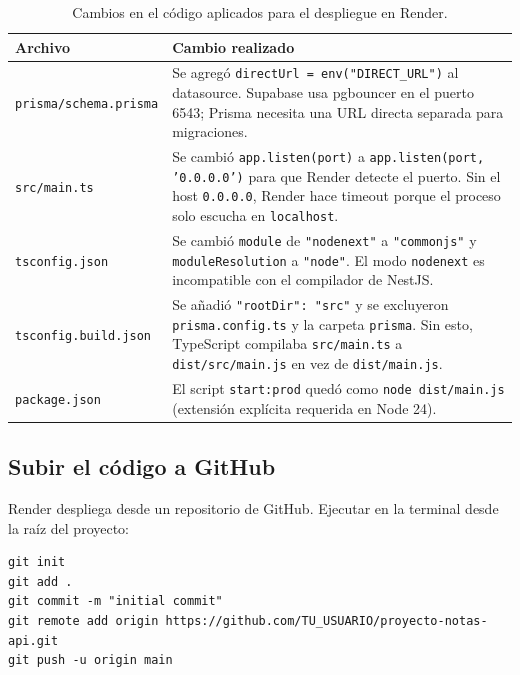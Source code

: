 \documentclass[12pt, a4paper]{article}
\newcommand{\cmd}[1]{\texttt{#1}}
\begin{document}
\begin{table}[H]
    \centering
    \begin{tabular}{p{4.5cm} p{9cm}}
        \toprule
        \textbf{Archivo} & \textbf{Cambio realizado} \\
        \midrule
        \cmd{prisma/schema.prisma}  & Se agregó \cmd{directUrl = env("DIRECT\_URL")} al datasource. Supabase usa pgbouncer en el puerto 6543; Prisma necesita una URL directa separada para migraciones. \\[0.3cm]
        \cmd{src/main.ts}           & Se cambió \cmd{app.listen(port)} a \cmd{app.listen(port, '0.0.0.0')} para que Render detecte el puerto. Sin el host \cmd{0.0.0.0}, Render hace timeout porque el proceso solo escucha en \cmd{localhost}. \\[0.3cm]
        \cmd{tsconfig.json}         & Se cambió \cmd{module} de \cmd{"nodenext"} a \cmd{"commonjs"} y \cmd{moduleResolution} a \cmd{"node"}. El modo \cmd{nodenext} es incompatible con el compilador de NestJS. \\[0.3cm]
        \cmd{tsconfig.build.json}   & Se añadió \cmd{"rootDir": "src"} y se excluyeron \cmd{prisma.config.ts} y la carpeta \cmd{prisma}. Sin esto, TypeScript compilaba \cmd{src/main.ts} a \cmd{dist/src/main.js} en vez de \cmd{dist/main.js}. \\[0.3cm]
        \cmd{package.json}          & El script \cmd{start:prod} quedó como \cmd{node dist/main.js} (extensión explícita requerida en Node 24). \\
        \bottomrule
    \end{tabular}
    \caption{Cambios en el código aplicados para el despliegue en Render.}
\end{table}

\subsection{Subir el código a GitHub}

Render despliega desde un repositorio de GitHub. Ejecutar en la terminal desde la raíz del proyecto:

\begin{lstlisting}[style=bash]
git init
git add .
git commit -m "initial commit"
git remote add origin https://github.com/TU_USUARIO/proyecto-notas-api.git
git push -u origin main
\end{lstlisting}

\end{document}
